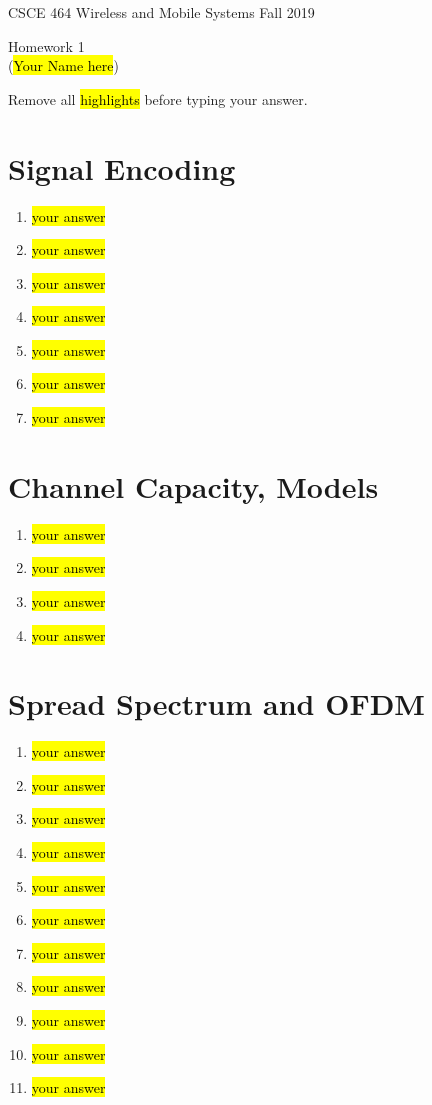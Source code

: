 \documentclass[11pt]{article}
\begin{document}
\newcommand{\answer}[1]{\mbox{~}}

{\large  CSCE 464 Wireless and Mobile Systems  \hfill Fall 2019\\
 \begin{center}
   Homework 1 \\
   (\hl{Your Name here}) \\
    \end{center}
}

Remove all \hl{highlights} before typing your answer.

\section{Signal Encoding}
\begin{enumerate}[label=(\alph*)]
\item \hl{your answer}
\item \hl{your answer}
\item \hl{your answer}
\item \hl{your answer}
\item \hl{your answer} 
\item \hl{your answer} 
\item \hl{your answer}
\end{enumerate}
 


\section{Channel Capacity, Models}
\begin{enumerate}[label=(\alph*)]
\item \hl{your answer}
\item \hl{your answer}
\item \hl{your answer}
\item \hl{your answer}
\end{enumerate}


\section{Spread Spectrum and OFDM}
\begin{enumerate}[label=(\alph*)]
\item \hl{your answer}
\item \hl{your answer}
\item \hl{your answer}
\item \hl{your answer}
\item \hl{your answer} 
\item \hl{your answer}
\item \hl{your answer}
\item \hl{your answer}
\item \hl{your answer}
\item \hl{your answer}
\item \hl{your answer}
\end{enumerate}
	
\end{document}
